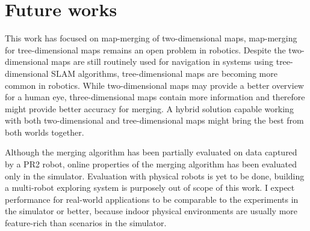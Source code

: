 \chapter{Future works}
\label{sec:future-works}

This work has focused on map-merging of two-dimensional maps, map-merging for tree-dimensional maps remains an open problem in robotics. Despite the two-dimensional maps are still routinely used for navigation in systems using tree-dimensional \gls{SLAM} algorithms, tree-dimensional maps are becoming more common in robotics. While two-dimensional maps may provide a better overview for a human eye, three-dimensional maps contain more information and therefore might provide better accuracy for merging. A hybrid solution capable working with both two-dimensional and tree-dimensional maps might bring the best from both worlds together.

Although the merging algorithm has been partially evaluated on data captured by a PR2 robot, online properties of the merging algorithm has been evaluated only in the simulator. Evaluation with physical robots is yet to be done, building a multi-robot exploring system is purposely out of scope of this work. I expect performance for real-world applications to be comparable to the experiments in the simulator or better, because indoor physical environments are usually more feature-rich than scenarios in the simulator.
